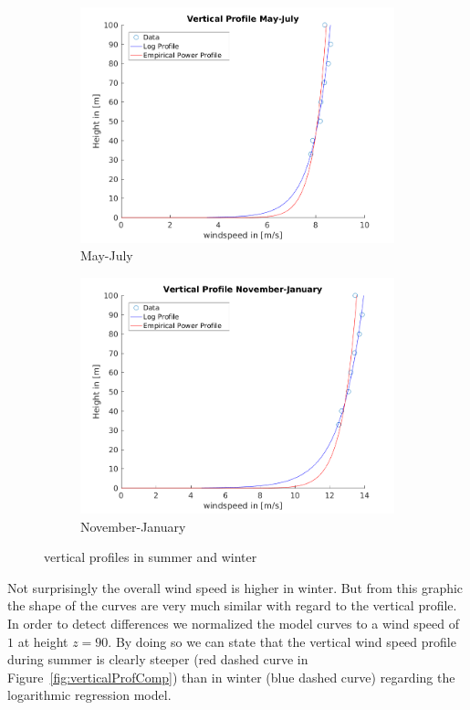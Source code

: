 \documentclass[10pt]{article}
\begin{document}
\begin{figure}[H]
\begin{subfigure}{0.5\textwidth}
  \centering
  \includegraphics[width=1\linewidth]{../figures/verticalProfileFitsSommer.png}
  \caption{May-July}
\end{subfigure}
\begin{subfigure}{0.5\textwidth}
  \centering
  \includegraphics[width=1\linewidth]{../figures/verticalProfileFitsWinter.png}
  \caption{November-January}
\end{subfigure}
  \caption{vertical profiles in summer and winter}
\label{fig:seasonalProfiles}
\end{figure}

Not surprisingly the overall wind speed is higher in winter. But from this graphic the shape of the curves are very much similar with regard to the vertical profile. In order to detect differences we normalized the model curves to a wind speed of $1$ at height $z=90$. By doing so we can state that the vertical wind speed profile during summer is clearly steeper (red dashed curve in Figure~\ref{fig:verticalProfComp}) than in winter (blue dashed curve) regarding the logarithmic regression model. 
\end{document}
